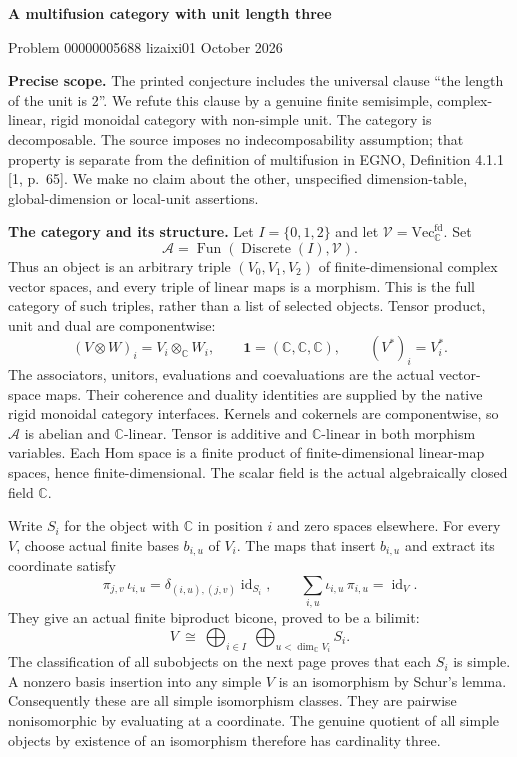 \documentclass[11pt,a4paper]{article}
\newcommand{\C}{\mathbb C}
\newcommand{\V}{\mathcal V}
\begin{document}
\begin{center}
{\Large\bfseries A multifusion category with unit length three}\par
\smallskip
Problem 00000005688 \quad lizaixi01  October 2026
\end{center}

\textbf{Precise scope.}
The printed conjecture includes the universal clause ``the length of the unit is 2''.
We refute this clause by a genuine finite semisimple, complex-linear, rigid monoidal
category with non-simple unit. The category is decomposable. The source imposes no
indecomposability assumption; that property is separate from the definition of
multifusion in EGNO, Definition 4.1.1 [1, p.~65]. We make no claim about the other,
unspecified dimension-table, global-dimension or local-unit assertions.

\textbf{The category and its structure.}
Let $I=\{0,1,2\}$ and let $\V=\mathrm{Vec}_{\C}^{\mathrm{fd}}$. Set
\[
  \mathcal A=\operatorname{Fun}(\operatorname{Discrete}(I),\V).
\]
Thus an object is an arbitrary triple $(V_0,V_1,V_2)$ of finite-dimensional complex
vector spaces, and every triple of linear maps is a morphism. This is the full
category of such triples, rather than a list of selected objects. Tensor product,
unit and dual are componentwise:
\[
 (V\otimes W)_i=V_i\otimes_{\C}W_i,
 \qquad \mathbf1=(\C,\C,\C),\qquad (V^*)_i=V_i^*.
\]
The associators, unitors, evaluations and coevaluations are the actual vector-space
maps. Their coherence and duality identities are supplied by the native rigid
monoidal category interfaces. Kernels and cokernels are componentwise, so
$\mathcal A$ is abelian and $\C$-linear. Tensor is additive and $\C$-linear in both
morphism variables. Each Hom space is a finite product of finite-dimensional
linear-map spaces, hence finite-dimensional. The scalar field is the actual
algebraically closed field $\C$.

Write $S_i$ for the object with $\C$ in position $i$ and zero spaces elsewhere.
For every $V$, choose actual finite bases $b_{i,u}$ of $V_i$. The maps that insert
$b_{i,u}$ and extract its coordinate satisfy
\[
 \pi_{j,v}\,\iota_{i,u}=\delta_{(i,u),(j,v)}\operatorname{id}_{S_i},
 \qquad \sum_{i,u}\iota_{i,u}\,\pi_{i,u}=\operatorname{id}_V.
\]
They give an actual finite biproduct bicone, proved to be a bilimit:
\[
 V\ \cong\ \bigoplus_{i\in I}\ \bigoplus_{u<\dim_{\C}V_i} S_i.
\]
The classification of all subobjects on the next page proves that each $S_i$ is
simple. A nonzero basis insertion into any simple $V$ is an isomorphism by Schur's
lemma. Consequently these are all simple isomorphism classes. They are pairwise
nonisomorphic by evaluating at a coordinate. The genuine quotient of all simple
objects by existence of an isomorphism therefore has cardinality three.
\end{document}
